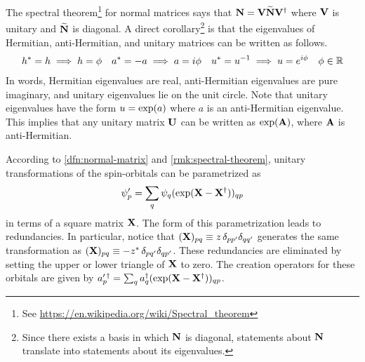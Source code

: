 \documentclass[11pt]{article}
\numberwithin{equation}{section}
\begin{document}
\begin{rmk}
\label{rmk:spectral-theorem}
The spectral theorem\footnote{See \url{https://en.wikipedia.org/wiki/Spectral_theorem}} for normal matrices says that $\mathbf{N}=\mathbf{V}\widetilde{\mathbf{N}}\mathbf{V}^\dagger$ where $\mathbf{V}$ is unitary and $\widetilde{\mathbf{N}}$ is diagonal.
A direct corollary\footnote{Since there exists a basis in which $\mathbf{N}$ is diagonal, statements about $\mathbf{N}$ translate into statements about its eigenvalues.} is that the eigenvalues of Hermitian, anti-Hermitian, and unitary matrices can be written as follows.
\begin{align}
  h^*
=
  h
\implies
  h
=
  \phi 
&&
  a^*
=
-
  a
\implies
  a
=
  i\phi 
&&
  u^*
=
  u^{-1}
\implies
  u
=
  e^{i\phi }
&&
  \phi 
\in
  \mathbb{R}
\end{align}
In words, Hermitian eigenvalues are real, anti-Hermitian eigenvalues are pure imaginary, and unitary eigenvalues lie on the unit circle.
Note that unitary eigenvalues have the form $u=\mathrm{exp}(a)$ where $a$ is an anti-Hermitian eigenvalue.
This implies that any unitary matrix $\mathbf{U}$ can be written as $\mathrm{exp}(\mathbf{A})$, where $\mathbf{A}$ is anti-Hermitian.
\end{rmk}

\begin{rmk}
\label{rmk:spin-orbital-transformation-law}
According to \cref{dfn:normal-matrix} and \cref{rmk:spectral-theorem}, unitary transformations of the spin-orbitals can be parametrized as
\begin{align}
\label{eq:spin-orbital-transformation}
  \psi _p'
=
  \sum_q
  \psi _q
  (\mathrm{exp}(\mathbf{X} - \mathbf{X}^\dagger))_{qp}
\end{align}
in terms of a square matrix $\mathbf{X}$.
The form of this parametrization leads to redundancies.
In particular, notice that $(\mathbf{X})_{pq}\equiv z\,\delta _{pp'}\delta _{qq'}$ generates the same transformation as $(\mathbf{X})_{pq}\equiv -z^*\,\delta _{pq'}\delta _{qp'}$.
These redundancies are eliminated by setting the upper or lower triangle of $\mathbf{X}$ to zero.
The creation operators for these orbitals are given by
$
  a_p^{\prime\,\dagger}
=
  \sum_q
  a_q^\dagger
  (\mathrm{exp}(\mathbf{X} - \mathbf{X}^\dagger))_{qp}
$.
\end{rmk}
\end{document}
